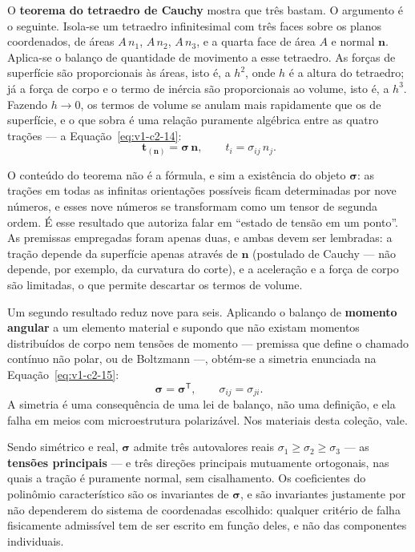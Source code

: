 \documentclass[12pt,a4paper]{article}
\numberwithin{equation}{section}
\numberwithin{table}{section}
\numberwithin{figure}{section}
\begin{document}
O \textbf{teorema do tetraedro de Cauchy} mostra que três bastam. O argumento é
o seguinte. Isola-se um tetraedro infinitesimal com três faces sobre os planos
coordenados, de áreas $A\,n_1$, $A\,n_2$, $A\,n_3$, e a quarta face de área $A$
e normal $\mathbf{n}$. Aplica-se o balanço de quantidade de movimento a esse
tetraedro. As forças de superfície são proporcionais às áreas, isto é, a $h^2$,
onde $h$ é a altura do tetraedro; já a força de corpo e o termo de inércia são
proporcionais ao volume, isto é, a $h^3$. Fazendo $h \to 0$, os termos de
volume se anulam mais rapidamente que os de superfície, e o que sobra é uma
relação puramente algébrica entre as quatro trações --- a
Equação~\eqref{eq:v1-c2-14}:
\begin{equation}\label{eq:v1-c2-14}
\mathbf{t}_{(\mathbf{n})} = \boldsymbol{\sigma}\,\mathbf{n},
\qquad t_i = \sigma_{ij}\,n_j .
\end{equation}

O conteúdo do teorema não é a fórmula, e sim a existência do objeto
$\boldsymbol{\sigma}$: as trações em todas as infinitas orientações possíveis
ficam determinadas por nove números, e esses nove números se transformam como
um tensor de segunda ordem. É esse resultado que autoriza falar em ``estado de
tensão em um ponto''. As premissas empregadas foram apenas duas, e ambas devem
ser lembradas: a tração depende da superfície apenas através de $\mathbf{n}$
(postulado de Cauchy --- não depende, por exemplo, da curvatura do corte), e a
aceleração e a força de corpo são limitadas, o que permite descartar os termos
de volume.

Um segundo resultado reduz nove para seis. Aplicando o balanço de
\textbf{momento angular} a um elemento material e supondo que não existam
momentos distribuídos de corpo nem tensões de momento --- premissa que define o
chamado contínuo não polar, ou de Boltzmann ---, obtém-se a simetria enunciada
na Equação~\eqref{eq:v1-c2-15}:
\begin{equation}\label{eq:v1-c2-15}
\boldsymbol{\sigma} = \boldsymbol{\sigma}^{\mathsf{T}},
\qquad \sigma_{ij} = \sigma_{ji}.
\end{equation}
A simetria é uma consequência de uma lei de balanço, não uma definição, e ela
falha em meios com microestrutura polarizável. Nos materiais desta coleção,
vale.

Sendo simétrico e real, $\boldsymbol{\sigma}$ admite três autovalores reais
$\sigma_1 \ge \sigma_2 \ge \sigma_3$ --- as \textbf{tensões principais} --- e
três direções principais mutuamente ortogonais, nas quais a tração é puramente
normal, sem cisalhamento. Os coeficientes do polinômio característico são os
invariantes de $\boldsymbol{\sigma}$, e são invariantes justamente por não
dependerem do sistema de coordenadas escolhido: qualquer critério de falha
fisicamente admissível tem de ser escrito em função deles, e não das
componentes individuais.
\end{document}
